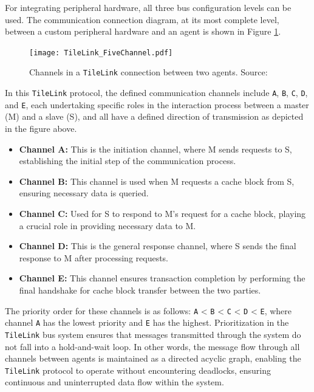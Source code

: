 For integrating peripheral hardware, all three bus configuration levels can be used. The communication connection diagram, at its most complete level, between a custom peripheral hardware and an agent is shown in Figure \ref{fig:tilelink_channels}.

\begin{figure}[h!]
    \centering
    \texttt{[image: TileLink\_FiveChannel.pdf]}
    \caption{Channels in a \texttt{TileLink} connection between two agents. Source: \cite{sifive2018tilelink}}
    \label{fig:tilelink_channels}
\end{figure}

In this \texttt{TileLink} protocol, the defined communication channels include \texttt{A}, \texttt{B}, \texttt{C}, \texttt{D}, and \texttt{E}, each undertaking specific roles in the interaction process between a master (M) and a slave (S), and all have a defined direction of transmission as depicted in the figure above.
\begin{itemize}
    \item \textbf{Channel A:} This is the initiation channel, where M sends requests to S, establishing the initial step of the communication process.
    \item \textbf{Channel B:} This channel is used when M requests a cache block from S, ensuring necessary data is queried.
    \item \textbf{Channel C:} Used for S to respond to M's request for a cache block, playing a crucial role in providing necessary data to M.
    \item \textbf{Channel D:} This is the general response channel, where S sends the final response to M after processing requests.
    \item \textbf{Channel E:} This channel ensures transaction completion by performing the final handshake for cache block transfer between the two parties.
\end{itemize}

The priority order for these channels is as follows: \texttt{A} < \texttt{B} < \texttt{C} < \texttt{D} < \texttt{E}, where channel \texttt{A} has the lowest priority and \texttt{E} has the highest. Prioritization in the \texttt{TileLink} bus system ensures that messages transmitted through the system do not fall into a hold-and-wait loop. In other words, the message flow through all channels between agents is maintained as a directed acyclic graph, enabling the \texttt{TileLink} protocol to operate without encountering deadlocks, ensuring continuous and uninterrupted data flow within the system.

